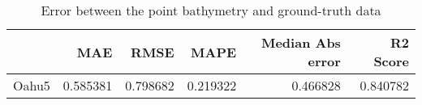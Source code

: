 \begin{table}[h!]
\caption{Error between the point bathymetry and ground-truth data}
\label{tab:Oahu5_lidar_error}
\begin{tabular}{lrrrrr}
\toprule
 & MAE & RMSE & MAPE & Median Abs error & R2 Score \\
\midrule
Oahu5 & 0.585381 & 0.798682 & 0.219322 & 0.466828 & 0.840782 \\
\bottomrule
\end{tabular}
\end{table}
